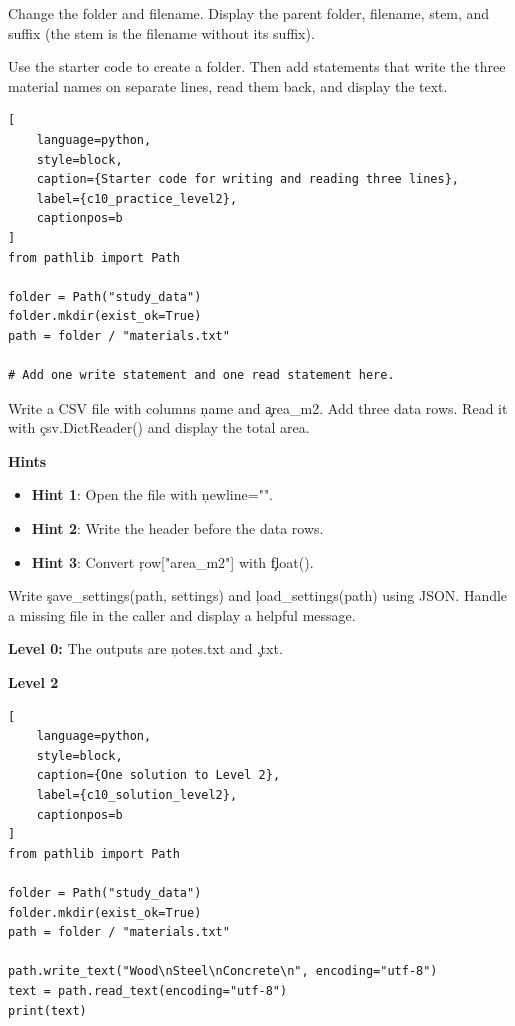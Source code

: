 
Change the folder and filename. Display the parent folder, filename, stem, and
suffix (the stem is the filename without its suffix).


Use the starter code to create a folder. Then add statements that write the
three material names on separate lines, read them back, and display the text.

\begin{lstlisting}[
    language=python,
    style=block,
    caption={Starter code for writing and reading three lines},
    label={c10_practice_level2},
    captionpos=b
]
from pathlib import Path

folder = Path("study_data")
folder.mkdir(exist_ok=True)
path = folder / "materials.txt"

# Add one write statement and one read statement here.
\end{lstlisting}


Write a CSV file with columns \c{name} and \c{area_m2}. Add three data rows.
Read it with \c{csv.DictReader()} and display the total area.

\textbf{Hints}
\begin{itemize}
    \item \textbf{Hint 1}: Open the file with \c{newline=""}.
    \item \textbf{Hint 2}: Write the header before the data rows.
    \item \textbf{Hint 3}: Convert \c{row["area_m2"]} with \c{float()}.
\end{itemize}


Write \c{save_settings(path, settings)} and \c{load_settings(path)} using JSON.
Handle a missing file in the caller and display a helpful message.


\textbf{Level 0:} The outputs are \c{notes.txt} and \c{.txt}.

\textbf{Level 2}

\begin{lstlisting}[
    language=python,
    style=block,
    caption={One solution to Level 2},
    label={c10_solution_level2},
    captionpos=b
]
from pathlib import Path

folder = Path("study_data")
folder.mkdir(exist_ok=True)
path = folder / "materials.txt"

path.write_text("Wood\nSteel\nConcrete\n", encoding="utf-8")
text = path.read_text(encoding="utf-8")
print(text)
\end{lstlisting}

